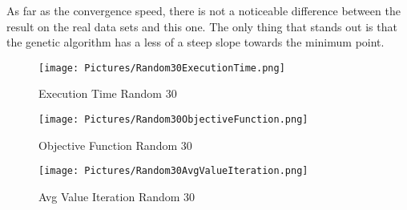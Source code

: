 As far as the convergence speed, there is not a noticeable difference between the result on the real data sets and this one. The only thing that stands out is that the genetic algorithm has a less of a steep slope towards the minimum point.

\begin{figure}[ht]
	\texttt{[image: Pictures/Random30ExecutionTime.png]}
	\caption{ Execution Time Random 30}
	\label{Execution Time Random 30}
\end{figure}

\begin{figure}
	\texttt{[image: Pictures/Random30ObjectiveFunction.png]}
	\caption{ Objective Function Random 30 }
	\label{Objective Function Random 30}
\end{figure}

\begin{figure}[ht]
	\texttt{[image: Pictures/Random30AvgValueIteration.png]}
	\caption{ Avg Value Iteration Random 30 }
	\label{Avg Value Iteration Random 30}
\end{figure}

\newpage

